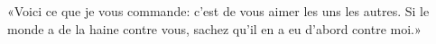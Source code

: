 \encetemps \jesusdisciples
	«Voici ce que je vous commande: c’est de vous aimer les uns les autres.
Si le monde a de la haine contre vous,
	sachez qu’il en a eu d’abord contre moi.»
